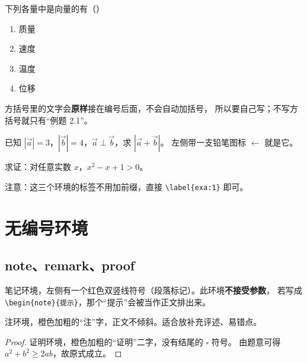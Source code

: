 \documentclass[lang=cn,newtx,10pt,scheme=chinese,nofont]{elegantbook}
\begin{document}
\begin{example}[条（2023 新高考）]
下列各量中是向量的有（\quad）
\begin{enumerate}[(1)]
    \item 质量
    \item 速度
    \item 温度
    \item 位移
\end{enumerate}
\end{example}

方括号里的文字会\textbf{原样}接在编号后面，不会自动加括号，
所以要自己写；不写方括号就只有“例题 2.1”。

\begin{exercise}
已知 $|\vec{a}|=3$，$|\vec{b}|=4$，$\vec{a} \perp \vec{b}$，求 $|\vec{a}+\vec{b}|$。
左侧带一支铅笔图标 $\leftarrow$ 就是它。
\end{exercise}

\begin{problem}
求证：对任意实数 $x$，$x^2-x+1>0$。
\end{problem}

注意：这三个环境的标签不用加前缀，直接 \verb|\label{exa:1}| 即可。


\chapter{无编号环境}

\section{note、remark、proof}

\begin{note}
笔记环境，左侧有一个红色双竖线符号（段落标记）。此环境\textbf{不接受参数}，
若写成 \verb|\begin{note}{提示}|，那个“提示”会被当作正文排出来。
\end{note}

\begin{remark}
注环境，橙色加粗的“注”字，正文不倾斜。适合放补充评述、易错点。
\end{remark}

\begin{proof}
证明环境，橙色加粗的“证明”二字，没有结尾的 $\square$ 符号。
由题意可得 $a^2+b^2 \geq 2ab$，故原式成立。
\end{proof}
\end{document}
